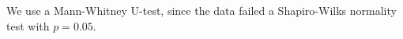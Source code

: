 We use a Mann-Whitney U-test, since the data failed a Shapiro-Wilks normality test with $p = 0.05$. 